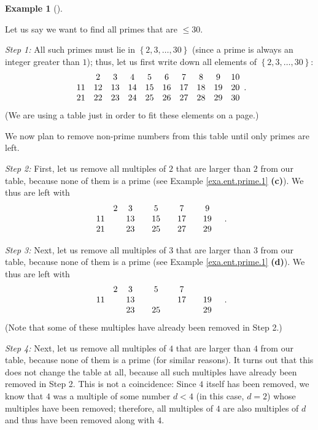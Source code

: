 \documentclass[numbers=enddot,12pt,final,onecolumn,notitlepage]{scrartcl}%
\numberwithin{exer}{subsection}
\theoremstyle{definition}
\newtheorem{exam}[theo]{Example}
\newenvironment{example}[1][]
{\begin{exam}[#1]\begin{leftbar}}
{\end{leftbar}\end{exam}}
\begin{document}
\begin{example}
Let us say we want to find all primes that are $\leq30$.

\textit{Step 1:} All such primes must lie in $\left\{  2,3,\ldots,30\right\}
$ (since a prime is always an integer greater than $1$); thus, let us first
write down all elements of $\left\{  2,3,\ldots,30\right\}  $:%
\[%
\begin{array}
[c]{cccccccccc}
& 2 & 3 & 4 & 5 & 6 & 7 & 8 & 9 & 10\\
11 & 12 & 13 & 14 & 15 & 16 & 17 & 18 & 19 & 20\\
21 & 22 & 23 & 24 & 25 & 26 & 27 & 28 & 29 & 30
\end{array}
.
\]
(We are using a table just in order to fit these elements on a page.)

We now plan to remove non-prime numbers from this table until only primes are left.

\textit{Step 2:} First, let us remove all multiples of $2$ that are larger
than $2$ from our table, because none of them is a prime (see Example
\ref{exa.ent.prime.1} \textbf{(c)}). We thus are left with%
\[%
\begin{array}
[c]{cccccccccc}
& 2 & 3 &  & 5 &  & 7 &  & 9 & \\
11 &  & 13 &  & 15 &  & 17 &  & 19 & \\
21 &  & 23 &  & 25 &  & 27 &  & 29 &
\end{array}
.
\]


\textit{Step 3:} Next, let us remove all multiples of $3$ that are larger than
$3$ from our table, because none of them is a prime (see Example
\ref{exa.ent.prime.1} \textbf{(d)}). We thus are left with%
\[%
\begin{array}
[c]{cccccccccc}
& 2 & 3 &  & 5 &  & 7 &  &  & \\
11 &  & 13 &  &  &  & 17 &  & 19 & \\
&  & 23 &  & 25 &  &  &  & 29 &
\end{array}
.
\]
(Note that some of these multiples have already been removed in Step 2.)

\textit{Step 4:} Next, let us remove all multiples of $4$ that are larger than
$4$ from our table, because none of them is a prime (for similar reasons). It
turns out that this does not change the table at all, because all such
multiples have already been removed in Step 2. This is not a coincidence:
Since $4$ itself has been removed, we know that $4$ was a multiple of some
number $d<4$ (in this case, $d=2$) whose multiples have been removed;
therefore, all multiples of $4$ are also multiples of $d$ and thus have been
removed along with $4$.


\end{example}
\end{document}

